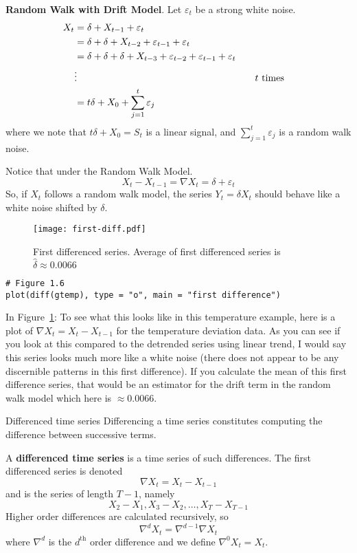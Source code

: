 \textbf{Random Walk with Drift Model}. Let $ \varepsilon_t $ be a strong white noise.
\begin{align*}
    X_t
     & =\delta+X_{t-1}+\varepsilon_t                                                                                  \\
     & =\delta+\delta+X_{t-2}+\varepsilon_{t-1}+\varepsilon_t                                                         \\
     & =\delta+\delta+\delta+X_{t-3}+\varepsilon_{t-2}+\varepsilon_{t-1}+\varepsilon_{t}                              \\
     & \vdots                                                                            & \quad & \text{$ t $ times} \\
     & =t\delta+X_0+\sum_{j=1}^{t} \varepsilon_j
\end{align*}
where we note that $ t\delta+X_0=S_t $ is a linear signal,
and $ \sum_{j=1}^{t} \varepsilon_j $ is a
random walk noise.

Notice that under the Random Walk Model.
\[ X_t-X_{t-1}=\nabla X_t=\delta+\varepsilon_t \]
So, if $ X_t $ follows a random walk model, the series $ Y_t=\delta X_t $
should behave like a white noise shifted by $ \delta $.
\begin{figure}[!ht]
    \centering
    \texttt{[image: first-diff.pdf]}
    \caption{First differenced series. Average of first differenced series
        is $ \hat{\delta}\approx 0.0066 $}\label{fig:firstdiff}
\end{figure}
\begin{verbatim}
# Figure 1.6
plot(diff(gtemp), type = "o", main = "first difference")
\end{verbatim}
In Figure~\ref{fig:firstdiff}:
{\color{blue}To see what this looks like in this temperature example, here is a plot
of $ \nabla X_t=X_t-X_{t-1} $ for the temperature deviation data. As you can
see if you look at this compared to the detrended series using linear trend,
I would say this series looks much more like a white noise (there does not
appear to be any discernible patterns in this first difference). If you calculate the mean
of this first difference series, that would be an estimator for the drift term
in the random walk model which here is $ \approx 0.0066 $.}

\begin{Definition}{Differenced time series}{}
    Differencing a time series constitutes
    computing the difference between successive terms.

    A \textbf{differenced time series} is a time series of such differences.
    The first differenced series is denoted
    \[ \nabla X_t=X_t-X_{t-1} \]
    and is the series of length $ T-1 $, namely
    \[ X_2-X_1,X_3-X_2,\ldots,X_T-X_{T-1} \]
    Higher order differences are calculated recursively, so
    \[ \nabla^d X_t=\nabla^{d-1}\nabla X_t \]
    where $ \nabla^d $ is the $ d^{\text{th}} $ order difference and
    we define $ \nabla^0 X_t=X_t $.
\end{Definition}

